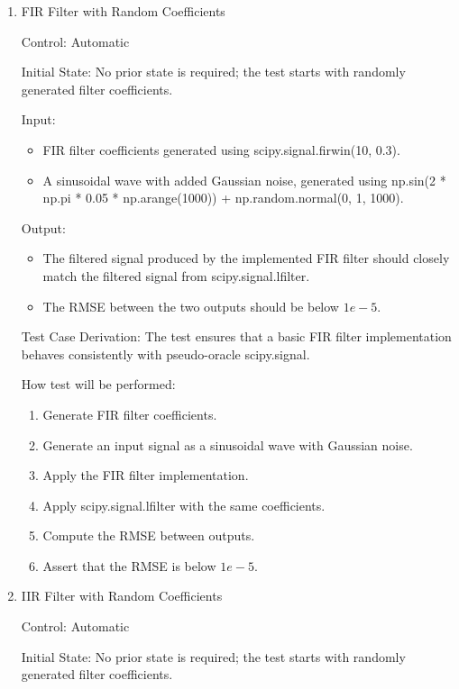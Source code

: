 \documentclass[12pt, titlepage]{article}
\begin{document}
\begin{enumerate}

\item{FIR Filter with Random Coefficients\\}

Control: Automatic
					
Initial State: No prior state is required; the test starts with randomly
generated filter coefficients.
					
Input:
\begin{itemize}
  \item FIR filter coefficients generated using scipy.signal.firwin(10, 0.3).
  \item A sinusoidal wave with added Gaussian noise, generated using np.sin(2 *
  np.pi * 0.05 * np.arange(1000)) + np.random.normal(0, 1, 1000).
\end{itemize}

Output:
\begin{itemize}
  \item The filtered signal produced by the implemented FIR filter should
  closely match the filtered signal from scipy.signal.lfilter.
  \item The RMSE between the two outputs should be below $1e-5$.
\end{itemize}

Test Case Derivation: The test ensures that a basic FIR filter implementation
behaves consistently with pseudo-oracle scipy.signal.
					
How test will be performed: 
\begin{enumerate}
  \item Generate FIR filter coefficients.
  \item Generate an input signal as a sinusoidal wave with Gaussian noise.
  \item Apply the FIR filter implementation.
  \item Apply scipy.signal.lfilter with the same coefficients.
  \item Compute the RMSE between outputs.
  \item Assert that the RMSE is below $1e-5$.
\end{enumerate}
					
\item{IIR Filter with Random Coefficients\\}

Control: Automatic
					
Initial State: No prior state is required; the test starts with randomly
generated filter coefficients.
					

\end{enumerate}
\end{document}
